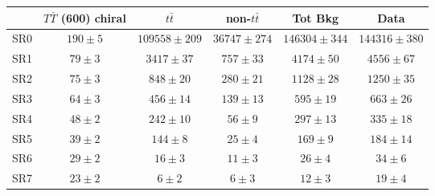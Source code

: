 \begin{tabular}{l c c c c c } \toprule\toprule
 & $T\bar{T}$ (600) chiral 		 & $t\bar{t}$ 		 & non-$t\bar{t}$ 		 & Tot Bkg 		 & Data 		 \\ \midrule 
  SR0  & $190 \pm 5$  & $109558 \pm 209$  & $36747 \pm 274$  & $146304 \pm 344$  & $144316 \pm 380$ \\ 
 SR1  & $79 \pm 3$  & $3417 \pm 37$  & $757 \pm 33$  & $4174 \pm 50$  & $4556 \pm 67$ \\ 
 SR2  & $75 \pm 3$  & $848 \pm 20$  & $280 \pm 21$  & $1128 \pm 28$  & $1250 \pm 35$ \\ 
 SR3  & $64 \pm 3$  & $456 \pm 14$  & $139 \pm 13$  & $595 \pm 19$  & $663 \pm 26$ \\ 
 SR4  & $48 \pm 2$  & $242 \pm 10$  & $56 \pm 9$  & $297 \pm 13$  & $335 \pm 18$ \\ 
 SR5  & $39 \pm 2$  & $144 \pm 8$  & $25 \pm 4$  & $169 \pm 9$  & $184 \pm 14$ \\ 
 SR6  & $29 \pm 2$  & $16 \pm 3$  & $11 \pm 3$  & $26 \pm 4$  & $34 \pm 6$ \\ 
 SR7  & $23 \pm 2$  & $6 \pm 2$  & $6 \pm 3$  & $12 \pm 3$  & $19 \pm 4$ \\ 
\bottomrule\end{tabular}